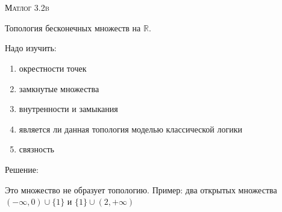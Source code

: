 \documentclass[10pt]{article}
\begin{document}
\def\chap#1#2{\ \\ {\large\bf#1 \ | \ \tt\scshape#2} \par}

\ \vspace{-1cm}

{\bf
\ \\
\Large\centerline{\scshape Матлог 3.2b}
}\normalsize

\vspace*{1cm}
Топология бесконечных множеств на $\mathbb{R}$.

Надо изучить: 
\begin{enumerate}
    \item окрестности точек
    \item замкнутые множества
    \item внутренности и замыкания
    \item является ли данная топология моделью классической логики
    \item связность
\end{enumerate}

Решение: 

Это множество не образует топологию. 
Пример: два открытых множества $(-\infty, 0) \cup \{1\}$ и $\{1\} \cup (2, +\infty)$
\end{document}
